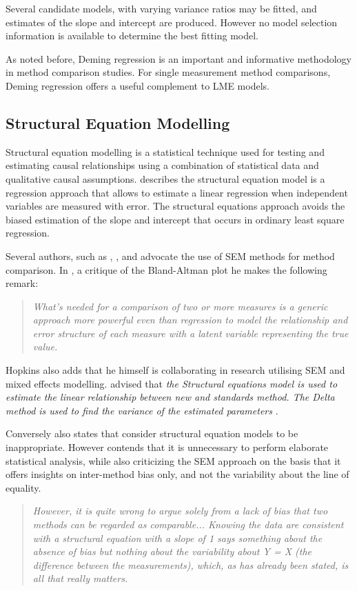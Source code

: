 \documentclass[12pt, a4paper]{report}
\theoremstyle{plain}
\theoremstyle{definition}
\theoremstyle{remark}
\begin{document}
Several candidate models, with varying variance ratios may be fitted, and estimates of the slope and intercept are produced. However no model selection information is available to determine the best fitting model.

As noted before, Deming regression is an important and informative methodology in method comparison studies. For single measurement method comparisons, Deming regression offers a useful complement to LME models.
	
\subsection{Structural Equation Modelling}
	
Structural equation modelling is a statistical technique used for testing and estimating causal relationships using a combination of statistical data and qualitative causal assumptions. \citet{carrasco2004} describes the structural equation model is a regression approach that allows to estimate a linear 
	regression when independent variables are measured with error.
	The structural equations approach avoids the biased estimation of the slope and intercept that occurs in ordinary least square regression.
	
Several authors, such as \citet{lewis1991}, \citet{gkelly1985}, \citet{voelkel2005} and \citet{hopkins2004bias} advocate the use of SEM methods for method comparison. In \citet{hopkins2004bias}, a critique of the Bland-Altman plot he makes the following remark:

\begin{quote}
\textit{What's needed for a comparison of two or more measures is a
		generic approach more powerful even than regression to model the
		relationship and error structure of each measure with a latent
		variable representing the true value.}
\end{quote}	

Hopkins also adds that he himself is collaborating in research utilising SEM and mixed effects modelling. \citet{gkelly1985} advised that \textit{the Structural equations model is used to estimate the linear relationship between new and standards method. The Delta method is used to find the variance of the estimated parameters} \citep{gkelly1985}.
	
	
Conversely \citet{BA99} also states that consider structural equation models to be inappropriate. However \citet{BA87} contends that it is unnecessary to perform elaborate statistical analysis, while also criticizing the SEM approach on the basis that it offers insights  on inter-method bias only, and not the variability about the line of equality. 
	\begin{quote}
		\textit{However, it is quite wrong to argue solely from a lack of bias that two methods can be regarded as comparable...
			Knowing the data are consistent with a structural equation with a slope of 1 says something 
			about the absence of bias but nothing about the variability about Y = X (the difference between the measurements), which, as has already been stated, is all that really matters.}
	\end{quote}
\end{document}
